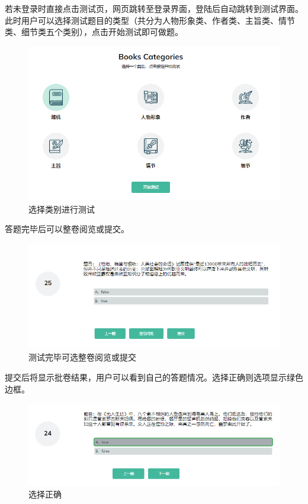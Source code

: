 \documentclass[twoside,11pt]{article}
\begin{document}
若未登录时直接点击测试页，网页跳转至登录界面，登陆后自动跳转到测试界面。此时用户可以选择测试题目的类型（共分为人物形象类、作者类、主旨类、情节类、细节类五个类别），点击开始测试即可做题。

\begin{figure}[H]
    \centering
    \includegraphics[width=0.8\columnwidth]{figures/testCate.png}
    \caption{选择类别进行测试}\label{fig:testCate}
\end{figure}

答题完毕后可以整卷阅览或提交。

\begin{figure}[H]
    \centering
    \includegraphics[width=0.8\columnwidth]{figures/testSubmit.png}
    \caption{测试完毕可选整卷阅览或提交}\label{fig:testSubmit}
\end{figure}

提交后将显示批卷结果，用户可以看到自己的答题情况。选择正确则选项显示绿色边框。

\begin{figure}[H]
    \centering
    \includegraphics[width=0.8\columnwidth]{figures/testRight.png}
    \caption{选择正确}\label{fig:testRight}
\end{figure}
\end{document}
